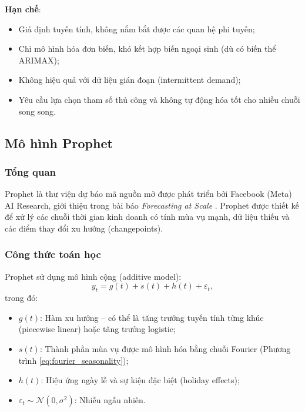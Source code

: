 \textbf{Hạn chế}:
\begin{itemize}
    \item Giả định tuyến tính, không nắm bắt được các quan hệ phi tuyến;
    \item Chỉ mô hình hóa đơn biến, khó kết hợp biến ngoại sinh (dù có biến thể ARIMAX);
    \item Không hiệu quả với dữ liệu gián đoạn (intermittent demand);
    \item Yêu cầu lựa chọn tham số thủ công và không tự động hóa tốt cho nhiều chuỗi song song.
\end{itemize}

\subsection{Mô hình Prophet}
\label{subsec:prophet}

\subsubsection{Tổng quan}

Prophet là thư viện dự báo mã nguồn mở được phát triển bởi Facebook (Meta) AI Research, giới thiệu trong bài báo \textit{Forecasting at Scale} \citep{taylor2018forecasting}. Prophet được thiết kế để xử lý các chuỗi thời gian kinh doanh có tính mùa vụ mạnh, dữ liệu thiếu và các điểm thay đổi xu hướng (changepoints).

\subsubsection{Công thức toán học}

Prophet sử dụng mô hình cộng (additive model):
\begin{equation}
    y_t = g(t) + s(t) + h(t) + \varepsilon_t,
    \label{eq:prophet}
\end{equation}
trong đó:
\begin{itemize}
    \item $g(t)$: Hàm xu hướng -- có thể là tăng trưởng tuyến tính từng khúc (piecewise linear) hoặc tăng trưởng logistic;
    \item $s(t)$: Thành phần mùa vụ được mô hình hóa bằng chuỗi Fourier (Phương trình \ref{eq:fourier_seasonality});
    \item $h(t)$: Hiệu ứng ngày lễ và sự kiện đặc biệt (holiday effects);
    \item $\varepsilon_t \sim \mathcal{N}(0, \sigma^2)$: Nhiễu ngẫu nhiên.
\end{itemize}

